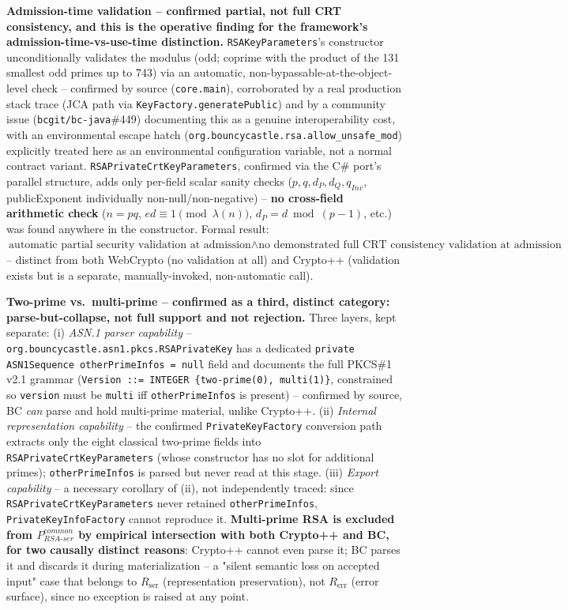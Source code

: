 \documentclass[11pt,a4paper]{article}
\begin{document}
\textbf{Admission-time validation -- confirmed partial, not full CRT consistency, and this is the operative finding for the framework's admission-time-vs-use-time distinction.} \texttt{RSAKeyParameters}'s constructor unconditionally validates the modulus (odd; coprime with the product of the 131 smallest odd primes up to 743) via an automatic, non-bypassable-at-the-object-level check -- confirmed by source (\texttt{core.main}), corroborated by a real production stack trace (JCA path via \texttt{KeyFactory.generatePublic}) and by a community issue (\texttt{bcgit/bc-java}\#449) documenting this as a genuine interoperability cost, with an environmental escape hatch (\texttt{org.bouncycastle.rsa.allow\_unsafe\_mod}) explicitly treated here as an environmental configuration variable, not a normal contract variant. \texttt{RSAPrivateCrtKeyParameters}, confirmed via the C\# port's parallel structure, adds only per-field scalar sanity checks ($p,q,d_P,d_Q,q_{Inv}$, publicExponent individually non-null/non-negative) -- \textbf{no cross-field arithmetic check} ($n=pq$, $ed\equiv1\pmod{\lambda(n)}$, $d_P=d\bmod(p-1)$, etc.) was found anywhere in the constructor. Formal result: $\text{automatic partial security validation at admission} \wedge \text{no demonstrated full CRT consistency validation at admission}$ -- distinct from both WebCrypto (no validation at all) and Crypto++ (validation exists but is a separate, manually-invoked, non-automatic call).

\textbf{Two-prime vs.\ multi-prime -- confirmed as a third, distinct category: parse-but-collapse, not full support and not rejection.} Three layers, kept separate: (i) \emph{ASN.1 parser capability} -- \texttt{org.bouncycastle.asn1.pkcs.RSAPrivateKey} has a dedicated \texttt{private ASN1Sequence otherPrimeInfos = null} field and documents the full PKCS\#1 v2.1 grammar (\texttt{Version ::= INTEGER \{two-prime(0), multi(1)\}}, constrained so \texttt{version} must be \texttt{multi} iff \texttt{otherPrimeInfos} is present) -- confirmed by source, BC \emph{can} parse and hold multi-prime material, unlike Crypto++. (ii) \emph{Internal representation capability} -- the confirmed \texttt{PrivateKeyFactory} conversion path extracts only the eight classical two-prime fields into \texttt{RSAPrivateCrtKeyParameters} (whose constructor has no slot for additional primes); \texttt{otherPrimeInfos} is parsed but never read at this stage. (iii) \emph{Export capability} -- a necessary corollary of (ii), not independently traced: since \texttt{RSAPrivateCrtKeyParameters} never retained \texttt{otherPrimeInfos}, \texttt{PrivateKeyInfoFactory} cannot reproduce it. \textbf{Multi-prime RSA is excluded from $P_{RSA\text{-}ser}^{common}$ by empirical intersection with both Crypto++ and BC, for two causally distinct reasons}: Crypto++ cannot even parse it; BC parses it and discards it during materialization -- a "silent semantic loss on accepted input" case that belongs to $R_{\text{ser}}$ (representation preservation), not $R_{\text{err}}$ (error surface), since no exception is raised at any point.
\end{document}
